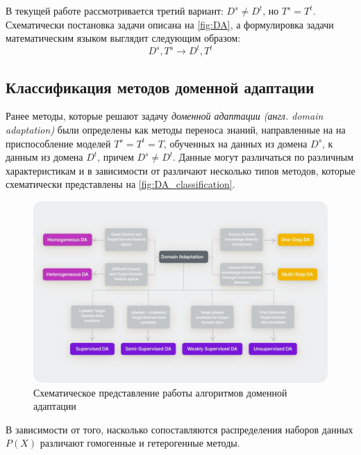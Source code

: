 В текущей работе рассмотривается третий вариант: $D^s \ne D^t$, но $T^s = T^t$. Схематически постановка задачи описана на \autoref{fig:DA}, а формулировка задачи математическим языком выглядит следующим образом:
$$D^s, T^s \to D^t, T^t$$

\subsection{Классификация методов доменной адаптации}

Ранее методы, которые решают задачу \textit{доменной адаптации (англ. domain adaptation)}  были определены как методы переноса знаний, направленные на на приспособление моделей $T^s = T^t = T$, обученных на данных из домена $D^s$, к данным из домена $D^t$, причем $D^s \ne D^t$. Данные могут различаться по различным характеристикам и в зависимости от различают несколько типов методов, которые схематически представлены на \autoref{fig:DA_classification}.

\begin{figure}[h]
	\centering
	\includegraphics[width=.9\textwidth]{./images/DA_classification.jpg}
	\caption{Схематическое представление работы алгоритмов доменной адаптации}
	\label{fig:DA_classification}
\end{figure}

\hfill \break
В зависимости от того, насколько сопоставляются распределения наборов данных $P(X)$ различают гомогенные и гетерогенные методы.

